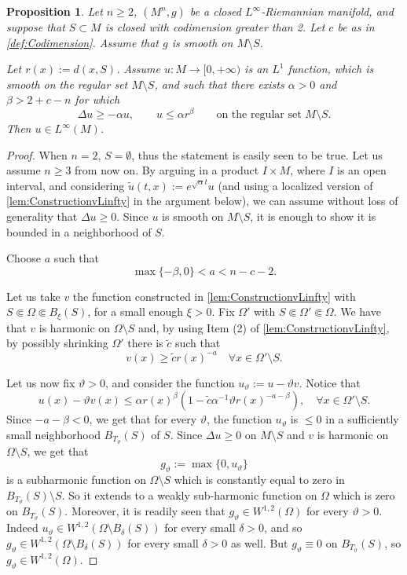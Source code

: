 \documentclass[12pt,a4paper,reqno]{amsart}
\newtheorem{prop}[theorem]{Proposition}
\renewcommand{\leq}{\leqslant}
\renewcommand{\geq}{\geqslant}
\renewcommand{\tilde}{\widetilde}
\begin{document}
\begin{prop}\label{LinftyResultForThm1}
    Let $n\geq 2$, $(M^n,g)$ be a closed $L^\infty$-Riemannian manifold, and suppose that $S\subset M$ is closed with codimension greater than 2. Let $c$ be as in \cref{def:Codimension}. Assume that $g$ is smooth on $M\setminus S$.
    
Let $r(x):= d(x,S)$. Assume $u:M\to [0,+\infty)$ is an $L^1$ function, which is smooth on the regular set $M\setminus S$, and such that there exists $\alpha>0$ and $\beta >2+c-n$ for which 
\[
\Delta u \geq -\alpha u, \qquad u \leq \alpha r^{\beta} \qquad \text{on the regular set $M\setminus S$}.
\]
Then $u\in L^\infty(M)$.
\end{prop}
\begin{proof}
When $n=2$, $S=\emptyset$, thus the statement is easily seen to be true. Let us assume $n\geq 3$ from now on. By arguing in a product $ I\times M$, where $I$ is an open interval, and considering $\tilde u(t,x):=e^{\sqrt{\alpha}t}u$ (and using a localized version of \cref{lem:ConstructionvLinfty} in the argument below), we can assume without loss of generality that $\Delta u\geq 0$. Since $u$ is smooth on $M\setminus S$, it is enough to show it is bounded in a neighborhood of $S$. 

    Choose $a$ such that
    \[
    \max\{-\beta,0\} < a < n-c-2.
    \]
    
    
    Let us take $v$ the function constructed in \cref{lem:ConstructionvLinfty} with $S\Subset \Omega\Subset B_{\xi}(S)$, for a small enough $\xi>0$. Fix $\Omega'$ with $S\Subset\Omega'\Subset\Omega$. We have that $v$ is harmonic on $\Omega\setminus S$ and, by using Item (2) of \cref{lem:ConstructionvLinfty}, by possibly shrinking $\Omega'$ there is $\tilde c$ such that
    \[
    v(x)\geq \tilde cr(x)^{-a} \quad \forall x\in \Omega'\setminus S.
    \]
    
    Let us now fix $\vartheta>0$, and consider the function $u_\vartheta:=u-\vartheta v$. Notice that
    \[
    u(x)-\vartheta v(x) \leq \alpha r(x)^{\beta}\left(1-\tilde c \alpha^{-1}\vartheta r(x)^{-a-\beta}\right), \quad \forall x\in \Omega'\setminus S.
    \]
    Since $-a-\beta<0$, we get that for every $\vartheta$, the function $u_\vartheta$ is $\leq 0$ in a sufficiently small neighborhood $B_{T_\vartheta}(S)$ of $S$. Since $\Delta u \geq 0$ on $M\setminus S$ and $v$ is harmonic on $\Omega\setminus S$, we get that 
    \[
    g_\vartheta:=\max\{0,u_\vartheta\}
    \]
    is a subharmonic function on $\Omega\setminus S$ which is constantly equal to zero in $B_{T_\vartheta}(S)\setminus S$. So it extends to a weakly sub-harmonic function on $\Omega$ which is zero on $B_{T_\vartheta}(S)$. Moreover, it is readily seen that $g_\vartheta\in W^{1,2}(\Omega)$ for every $\vartheta>0$. Indeed $u_\vartheta\in W^{1,2}(\Omega\setminus B_{\delta}(S))$ for every small $\delta>0$, and so $g_\vartheta\in W^{1,2}(\Omega\setminus B_{\delta}(S))$ for every small $\delta>0$ as well. But $g_\vartheta\equiv 0$ on $B_{T_\vartheta}(S)$, so $g_\vartheta\in W^{1,2}(\Omega)$. 
    

\end{proof}
\end{document}
